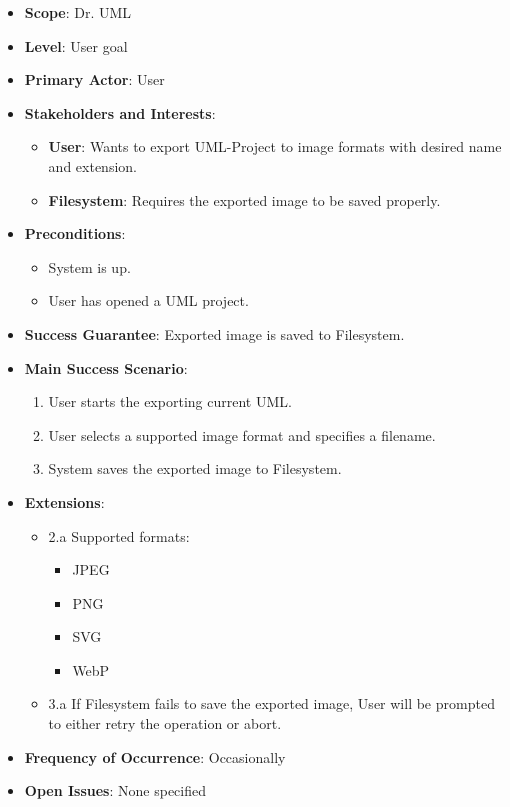 \documentclass[12pt]{article}
\begin{document}
\begin{itemize}
    \item \textbf{Scope}: Dr. UML
    \item \textbf{Level}: User goal
    \item \textbf{Primary Actor}: User
    \item \textbf{Stakeholders and Interests}:
    \begin{itemize}
        \item \textbf{User}: Wants to export UML-Project to image formats with desired name and extension.
        \item \textbf{Filesystem}: Requires the exported image to be saved properly.
    \end{itemize}
    \item \textbf{Preconditions}:
    \begin{itemize}
        \item System is up.
        \item User has opened a UML project.
    \end{itemize}
    \item \textbf{Success Guarantee}: Exported image is saved to Filesystem.
    \item \textbf{Main Success Scenario}:
    \begin{enumerate}
        \item User starts the exporting current UML.
        \item User selects a supported image format and specifies a filename.
        \item System saves the exported image to Filesystem.
    \end{enumerate}
    \item \textbf{Extensions}:
    \begin{itemize}
        \item 2.a Supported formats: 
        \begin{itemize}
            \item JPEG
            \item PNG
            \item SVG
            \item WebP
        \end{itemize}
        \item 3.a If Filesystem fails to save the exported image, User will be prompted to either retry the operation or abort.
    \end{itemize}
    \item \textbf{Frequency of Occurrence}: Occasionally
    \item \textbf{Open Issues}: None specified
\end{itemize}
\end{document}
